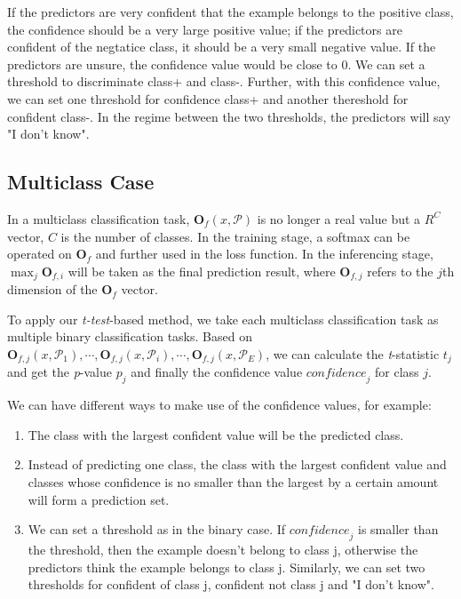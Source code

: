 \documentclass{article}
\begin{document}
If the predictors are very confident that the example belongs to the positive class, the confidence should be a very large positive value; if the predictors are confident of the negtatice class, it should be a very small negative value. If the predictors are unsure, the confidence value would be close to 0. We can set a threshold to discriminate class+ and class-. Further, with this confidence value, we can set one threshold for confidence class+ and another thereshold for confident class-. In the regime between the two thresholds, the predictors will say "I don't know".

\subsection{Multiclass Case}\label{sec:multi}
In a multiclass classification task, $ \textbf{O}_f \left(x , \mathcal{P}\right)$ is no longer a real value but a $R^C$ vector, $C$ is the number of classes. In the training stage, a softmax can be operated on $ \textbf{O}_f $ and further used in the loss function. In the inferencing stage, $\max_{j} \textbf{O}_{f,i}$ will be taken as the final prediction result, where $\textbf{O}_{f,j}$ refers to the $j$th dimension of the $ \textbf{O}_f $ vector.

To apply our \textit{t-test}-based method, we take each multiclass classification task as multiple binary classification tasks. Based on $\textbf{O}_{f,j} \left(x , \mathcal{P}_1\right),\cdots, \textbf{O}_{f,j} \left(x , \mathcal{P}_i\right),\cdots,\textbf{O}_{f,j} \left(x , \mathcal{P}_E\right) $, we can calculate the \textit{t}-statistic $\textit{t}_j$ and get the \textit{p}-value $\textit{p}_j$ and finally the confidence value $\textit{confidence}_j$ for class $j$. 

We can have different ways to make use of the confidence values, for example:
\begin{enumerate}
    \item The class with the largest confident value will be the predicted class.
    \item Instead of predicting one class, the class with the largest confident value and classes whose confidence is no smaller than the largest by a certain amount will form a prediction set.
    \item We can set a threshold as in the binary case. If $\textit{confidence}_j$ is smaller than the threshold, then the example doesn't belong to class j, otherwise the predictors think the example belongs to class j. Similarly, we can set two thresholds for confident of class j, confident not class j and "I don't know".
\end{enumerate}
\end{document}
